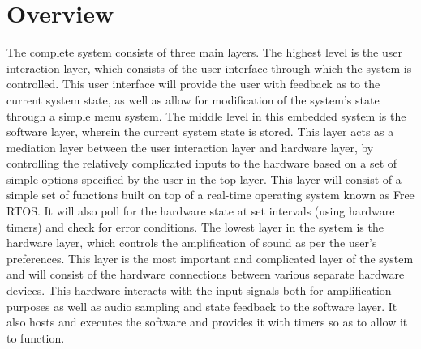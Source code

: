 \chapter{Overview}
The complete system consists of three main layers. The highest level is the user interaction layer, which consists of the user interface through which the system is controlled. This user interface will provide the user with feedback as to the current system state, as well as allow for modification of the system’s state through a simple menu system. The middle level in this embedded system is the software layer, wherein the current system state is stored. This layer acts as a mediation layer between the user interaction layer and hardware layer, by controlling the relatively complicated inputs to the hardware based on a set of simple options specified by the user in the top layer. This layer will consist of a simple set of functions built on top of a real-time operating system known as Free RTOS. It will also poll for the hardware state at set intervals (using hardware timers) and check for error conditions. The lowest layer in the system is the hardware layer, which controls the amplification of sound as per the user’s preferences. This layer is the most important and complicated layer of the system and will consist of the hardware connections between various separate hardware devices. This hardware interacts with the input signals both for amplification purposes as well as audio sampling and state feedback to the software layer. It also hosts and executes the software and provides it with timers so as to allow it to function.
